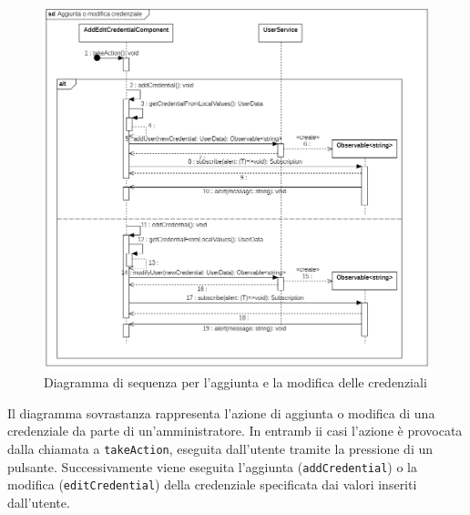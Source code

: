 \begin{figure}[H]
	\centering
	\includegraphics[width=18cm]{res/images/webapp-credenzialiAddEdit-diagrammaSequenza.png}
	\caption{Diagramma di sequenza per l'aggiunta e la modifica delle credenziali}
	\label{fig:DiagrammaSequenzaVisualizzazioneCredenziali}
\end{figure}
Il diagramma sovrastanza rappresenta l'azione di aggiunta o modifica di una credenziale da parte di un'amministratore. In entramb ii casi l'azione è provocata dalla chiamata a \texttt{takeAction}, eseguita dall'utente tramite la pressione di un pulsante. Successivamente viene eseguita l'aggiunta (\texttt{addCredential}) o la modifica (\texttt{editCredential}) della credenziale specificata dai valori inseriti dall'utente.



